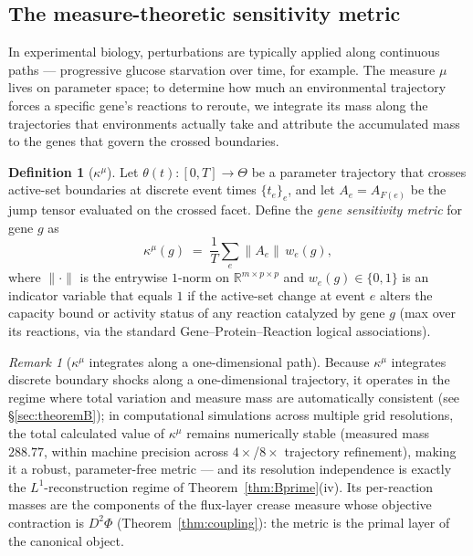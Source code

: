 \documentclass[11pt,a4paper]{article}
\theoremstyle{plain}
\theoremstyle{definition}
\newtheorem{definition}[theorem]{Definition}
\theoremstyle{remark}
\newtheorem{remark}[theorem]{Remark}
\newcommand{\kmu}{\kappa^{\mu}}
\newcommand{\RR}{\mathbb{R}}
\begin{document}
\subsection{The measure-theoretic sensitivity metric}

In experimental biology, perturbations are typically applied along
continuous paths --- progressive glucose starvation over time, for
example. The measure $\mu$ lives on parameter space; to determine how
much an environmental trajectory forces a specific gene's reactions to
reroute, we integrate its mass along the trajectories that
environments actually take and attribute the accumulated mass to the
genes that govern the crossed boundaries.

\begin{definition}[$\kmu$]\label{def:kmu}
Let $\theta(t) : [0, T] \to \Theta$ be a parameter trajectory that
crosses active-set boundaries at discrete event times $\{t_e\}_e$,
and let $A_e = A_{F(e)}$ be the jump tensor evaluated on the crossed
facet. Define the \emph{gene sensitivity metric} for gene $g$ as
\[
\kmu(g) \;=\; \frac{1}{T}\sum_{e} \bigl\| A_e \bigr\| \, w_e(g),
\]
where $\|{\cdot}\|$ is the entrywise $1$-norm on
$\RR^{m \times p \times p}$ and $w_e(g) \in \{0,1\}$ is an
indicator variable that equals $1$ if the active-set change at event
$e$ alters the capacity bound or activity status of any reaction
catalyzed by gene $g$ (max over its reactions, via the standard
Gene--Protein--Reaction logical associations).
\end{definition}

\begin{remark}[$\kmu$ integrates along a one-dimensional path]
Because $\kmu$ integrates discrete boundary shocks along a
one-dimensional trajectory, it operates in the regime where total
variation and measure mass are automatically consistent (see
\S\ref{sec:theoremB}); in computational simulations across multiple
grid resolutions, the total calculated value of $\kmu$ remains
numerically stable (measured mass $288.77$, within machine precision
across $4\times$/$8\times$ trajectory refinement), making it a
robust, parameter-free metric --- and its resolution independence is
exactly the $L^1$-reconstruction regime of
Theorem~\ref{thm:Bprime}(iv). Its per-reaction masses are the components of the
flux-layer crease measure whose objective contraction is $D^2\Phi$
(Theorem~\ref{thm:coupling}): the metric is the primal layer of the
canonical object.
\end{remark}
\end{document}
